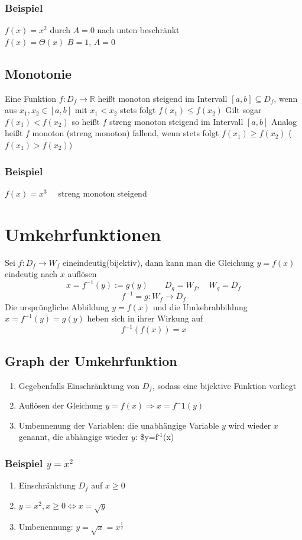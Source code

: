 \documentclass[11pt]{article}
\begin{document}
\subsubsection{Beispiel}
\label{sec-8-1-1}
$f(x) = x^2$ durch $A=0$ nach unten beschränkt\\
    $f(x) = \Theta(x)$ $B=1$, $A=0$
\subsection{Monotonie}
\label{sec-8-2}
Eine Funktion $f:D_f\to\mathbb{R}$ heißt monoton steigend im Intervall $[a,b] \subseteq D_f$, wenn aus $x_1,x_2\in [a,b]$ mit $x_1<x_2$ stets folgt $f(x_1) \leq f(x_2)$
Gilt sogar $f(x_1) < f(x_2)$ so heißt $f$ streng monoton steigend im Intervall $[a,b]$
Analog heißt $f$ monoton (streng monoton) fallend, wenn stets folgt $f(x_1) \geq f(x_2)$ ($f(x_1) > f(x_2)$)
\subsubsection{Beispiel}
\label{sec-8-2-1}
$f(x) = x^3\quad$ streng monoton steigend
\section{Umkehrfunktionen}
\label{sec-9}
Sei $f : D_f\to W_f$ eineindeutig(bijektiv), dann kann man die Gleichung $y=f(x)$ eindeutig nach $x$ auflösen \[x=f^{-1}(y):=g(y)\quad\quad D_g = W_f,\quad W_g = D_f\] \[f^{-1}=g:W_f\to D_f\]
Die ursprüngliche Abbildung $y=f(x)$ und die Umkehrabbildung $x=f^{-1}(y)=g(y)$ heben sich in ihrer Wirkung auf \[f^{-1}(f(x))= x\]
\subsection{Graph der Umkehrfunktion}
\label{sec-9-1}
\begin{enumerate}
\item Gegebenfalls Einschränktung von $D_f$, sodass eine bijektive Funktion vorliegt
\item Auflösen der Gleichung $y=f(x)\Rightarrow x=f^-1(y)$
\item Umbennenung der Variablen: die unabhängige Variable $y$ wird wieder $x$ genannt, die abhängige wieder $y$: \$y=f$^{\text{-1}}$(x)
\end{enumerate}
\subsubsection{Beispiel $y=x^2$}
\label{sec-9-1-1}
\begin{enumerate}
\item Einschränktung $D_f$ auf $x\geq 0$
\item $y=x^2, x\geq 0 \Leftrightarrow x = \sqrt{y}$
\item Umbenennung: $y=\sqrt{x} = x^\frac{1}{2}$
\end{enumerate}
\end{document}
